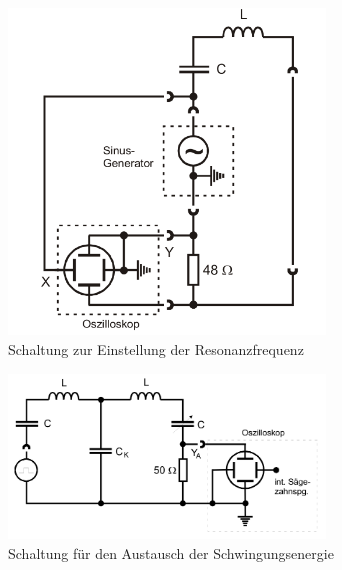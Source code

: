 \begin{figure}
    \centering
    \includegraphics[width=0.75\textwidth]{plots/Schaltung0.png}
    \caption{Schaltung zur Einstellung der Resonanzfrequenz \cite{Versuchsanleitung}}
    \label{fig:schaltung0}
\end{figure}

\begin{figure}
    \centering
    \includegraphics[width=0.75\textwidth]{plots/Schaltung1.png}
    \caption{Schaltung für den Austausch der Schwingungsenergie \cite{Versuchsanleitung}}
    \label{fig:schaltung1}
\end{figure}